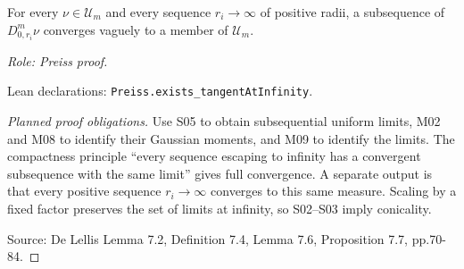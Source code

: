 \begin{lemma}
\label{lem:infinity-compactness}






For every $\nu\in\mathcal U_m$ and every sequence $r_i\to\infty$ of positive radii, a subsequence of $D^m_{0,r_i}\nu$ converges vaguely to a member of $\mathcal U_m$.
\par\emph{Role: Preiss proof.}
\par Lean declarations: \texttt{Preiss.exists\_tangentAtInfinity}.
\end{lemma}
\begin{proof}[Planned proof obligations]

Use S05 to obtain subsequential uniform limits, M02 and M08 to identify their
Gaussian moments, and M09 to identify the limits. The compactness principle
``every sequence escaping to infinity has a convergent subsequence with the
same limit'' gives full convergence. A separate output is that every positive
sequence $r_i\to\infty$ converges to this same measure. Scaling by a fixed
factor preserves the set of limits at infinity, so S02--S03 imply conicality.
\par Source: De Lellis Lemma 7.2, Definition 7.4, Lemma 7.6, Proposition 7.7, pp.70-84.
\end{proof}

